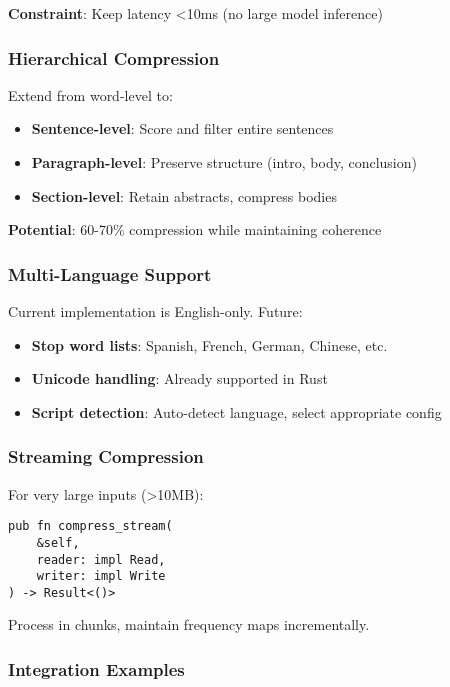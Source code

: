 \textbf{Constraint}: Keep latency <10ms (no large model inference)

\subsubsection{Hierarchical Compression}

Extend from word-level to:

\begin{itemize}
    \item \textbf{Sentence-level}: Score and filter entire sentences
    \item \textbf{Paragraph-level}: Preserve structure (intro, body, conclusion)
    \item \textbf{Section-level}: Retain abstracts, compress bodies
\end{itemize}

\textbf{Potential}: 60-70\% compression while maintaining coherence

\subsubsection{Multi-Language Support}

Current implementation is English-only. Future:

\begin{itemize}
    \item \textbf{Stop word lists}: Spanish, French, German, Chinese, etc.
    \item \textbf{Unicode handling}: Already supported in Rust
    \item \textbf{Script detection}: Auto-detect language, select appropriate config
\end{itemize}

\subsubsection{Streaming Compression}

For very large inputs (>10MB):

\begin{verbatim}
pub fn compress_stream(
    &self,
    reader: impl Read,
    writer: impl Write
) -> Result<()>
\end{verbatim}

Process in chunks, maintain frequency maps incrementally.

\subsubsection{Integration Examples}

